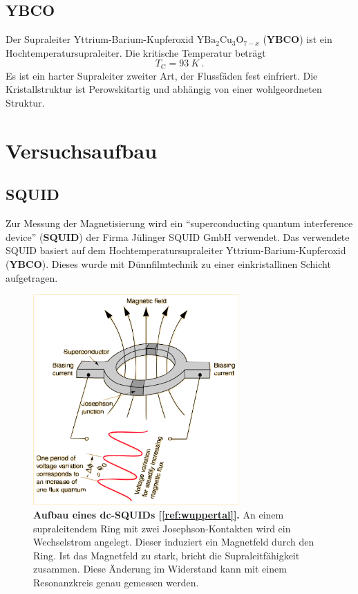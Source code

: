 \documentclass[a4paper,ngerman]{scrartcl}
\begin{document}
\subsection{YBCO}

Der Supraleiter Yttrium-Barium-Kupferoxid $\mathrm{YBa}_2 \mathrm{Cu}_3 \mathrm{O}_{7-x}$ (\textbf{YBCO}) ist ein Hochtemperatursupraleiter.
Die kritische Temperatur beträgt 
\begin{equation}
T_\mathrm{C} = \SI{93}{K} ~.
\end{equation}
Es ist ein harter Supraleiter zweiter Art, der Flussfäden fest einfriert.
Die Kristallstruktur ist Perowskitartig und abhängig von einer wohlgeordneten Struktur.


\section{Versuchsaufbau}

\subsection{SQUID}

Zur Messung der Magnetisierung wird ein "`superconducting quantum interference device"' (\textbf{SQUID}) der Firma Jülinger SQUID GmbH verwendet. 
Das verwendete SQUID basiert auf dem Hochtemperatursupraleiter Yttrium-Barium-Kupferoxid (\textbf{YBCO}).
Dieses wurde mit Dünnfilmtechnik zu einer einkristallinen Schicht aufgetragen.


\begin{figure}[tb!]
\centering
\includegraphics[width=0.7\textwidth]{abbildungen/squide.png}
\caption[Versuchsplatz]{\textbf{Aufbau eines dc-SQUIDs [\ref{ref:wuppertal}].} An einem supraleitendem Ring mit zwei Josephson-Kontakten wird ein Wechselstrom angelegt. 
Dieser induziert ein Magnetfeld durch den Ring. 
Ist das Magnetfeld zu stark, bricht die Supraleitfähigkeit zusammen.
Diese Änderung im Widerstand kann mit einem Resonanzkreis genau gemessen werden.}
\label{fig:squid_wuppertal}
\end{figure}
\end{document}
